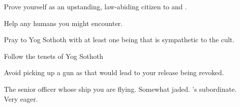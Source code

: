 \documentclass[char]{guildcamp4}
\begin{document}
\begin{itemz}[Goals]
	\item Prove yourself as an upstanding, law-abiding citizen to \cCbad{} and \cCgood{}.
	\item Help any humans you might encounter.
	\item Pray to Yog Sothoth with at least one being that is sympathetic to the cult.
	\item Follow the tenets of Yog Sothoth
	\item Avoid picking up a gun as that would lead to your release being revoked.
\end{itemz}

\begin{contacts}
	\contact{\cCbad{}} The senior officer whose ship you are flying. Somewhat jaded.
	\contact{\cCgood{}} \cCbad{}'s subordinate. Very eager.
\end{contacts}
\end{document}
